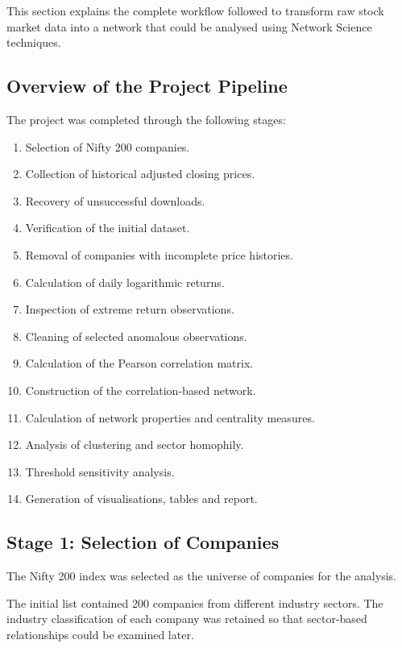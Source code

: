 \documentclass[11pt,a4paper]{article}
\begin{document}
This section explains the complete workflow followed to
transform raw stock market data into a network that could
be analysed using Network Science techniques.

\subsection{Overview of the Project Pipeline}

The project was completed through the following stages:

\begin{enumerate}
    \item Selection of Nifty 200 companies.
    \item Collection of historical adjusted closing prices.
    \item Recovery of unsuccessful downloads.
    \item Verification of the initial dataset.
    \item Removal of companies with incomplete price histories.
    \item Calculation of daily logarithmic returns.
    \item Inspection of extreme return observations.
    \item Cleaning of selected anomalous observations.
    \item Calculation of the Pearson correlation matrix.
    \item Construction of the correlation-based network.
    \item Calculation of network properties and centrality measures.
    \item Analysis of clustering and sector homophily.
    \item Threshold sensitivity analysis.
    \item Generation of visualisations, tables and report.
\end{enumerate}

\subsection{Stage 1: Selection of Companies}

The Nifty 200 index was selected as the universe of companies
for the analysis.

The initial list contained 200 companies from different
industry sectors. The industry classification of each company
was retained so that sector-based relationships could be
examined later.
\end{document}
